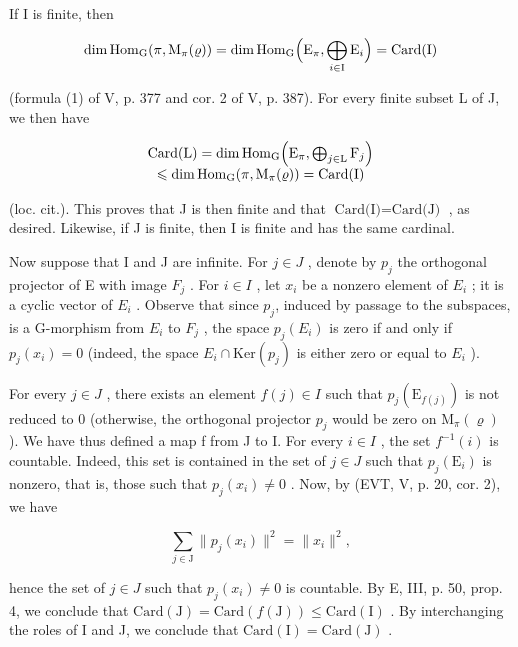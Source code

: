 If I is finite, then

\[
\dim \operatorname{Hom} _ {\mathrm{G}} (\pi , \mathrm{M} _ {\pi} (\varrho)) = \dim \operatorname{Hom} _ {\mathrm{G}} \Bigl (\mathrm{E} _ {\pi}, \bigoplus_ {i \in \mathrm{I}} \mathrm{E} _ {i} \Bigr) = \operatorname{Card} (\mathrm{I})
\]

(formula (1) of V, p. 377 and cor. 2 of V, p. 387). For every finite subset L of J, we then have

\[
\begin{array}{c} \operatorname{Card} (\mathrm{L}) = \dim \operatorname{Hom} _ {\mathrm{G}} \Bigl (\mathrm{E} _ {\pi}, \bigoplus_ {j \in \mathrm{L}} \mathrm{F} _ {j} \Bigr) \\ \leqslant \dim \operatorname{Hom} _ {\mathrm{G}} (\pi , \operatorname{M} _ {\pi} (\varrho)) = \operatorname{Card} (\mathrm{I}) \end{array}
\]

(loc. cit.). This proves that J is then finite and that \(\text{Card(I)} = \text{Card(J)}\) , as desired. Likewise, if J is finite, then I is finite and has the same cardinal.

Now suppose that I and J are infinite. For \(j \in J\) , denote by \(p_{j}\) the orthogonal projector of E with image \(F_{j}\) . For \(i \in I\) , let \(x_{i}\) be a nonzero element of \(E_{i}\) ; it is a cyclic vector of \(E_{i}\) . Observe that since \(p_{j}\), induced by passage to the subspaces, is a G-morphism from \(E_{i}\) to \(F_{j}\) , the space \(p_{j}(E_{i})\) is zero if and only if \(p_{j}(x_{i}) = 0\) (indeed, the space \(E_{i} \cap \text{Ker}(p_{j})\) is either zero or equal to \(E_{i}\) ).

For every \(j \in J\) , there exists an element \(f(j) \in I\) such that \(p_{j}(\mathrm{E}_{f(j)})\) is not reduced to 0 (otherwise, the orthogonal projector \(p_{j}\) would be zero on \(\mathrm{M}_{\pi}(\varrho)\) ). We have thus defined a map f from J to I. For every \(i \in I\) , the set \(f^{-1}(i)\) is countable. Indeed, this set is contained in the set of \(j \in J\) such that \(p_{j}(\mathrm{E}_{i})\) is nonzero, that is, those such that \(p_{j}(x_{i}) \neq 0\) . Now, by (EVT, V, p. 20, cor. 2), we have

\[
\sum_ {j \in \mathrm{J}} \| p _ {j} (x _ {i}) \| ^ {2} = \| x _ {i} \| ^ {2},
\]

hence the set of \(j \in J\) such that \(p_{j}(x_{i}) \neq 0\) is countable. By E, III, p. 50, prop. 4, we conclude that \(\text{Card}(\text{J}) = \text{Card}(f(\text{J})) \leqslant \text{Card}(\text{I})\) . By interchanging the roles of I and J, we conclude that \(\text{Card}(\text{I}) = \text{Card}(\text{J})\) .

